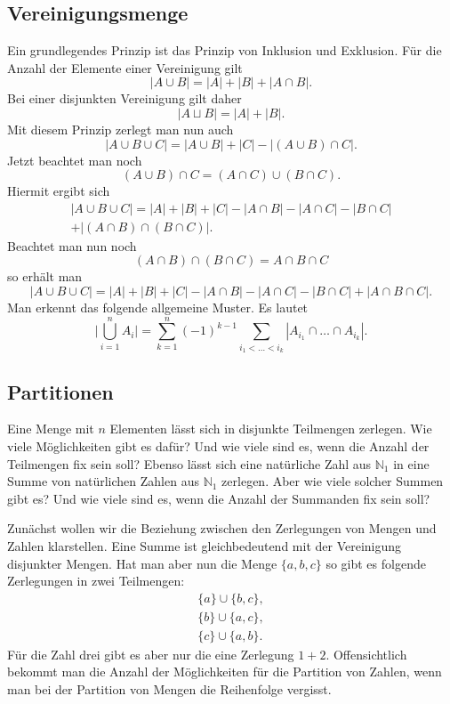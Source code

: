 \documentclass[a4paper,12pt,fleqn]{article}
\begin{document}
\subsection{Vereinigungsmenge}
Ein grundlegendes Prinzip ist das Prinzip von Inklusion und
Exklusion. Für die Anzahl der Elemente einer Vereinigung
gilt
\[|A\cup B| = |A|+|B|+|A\cap B|.\]
Bei einer disjunkten Vereinigung gilt daher
\[|A\sqcup B| = |A|+|B|.\]
Mit diesem Prinzip zerlegt man nun auch
\[|A\cup B\cup C| = |A\cup B|+|C|-|(A\cup B)\cap C|.\]
Jetzt beachtet man noch
\[(A\cup B)\cap C = (A\cap C)\cup(B\cap C).\]
Hiermit ergibt sich
\begin{gather*}
|A\cup B\cup C| = |A|+|B|+|C|-|A\cap B|-|A\cap C|-|B\cap C|\\
+|(A\cap B)\cap (B\cap C)|.
\end{gather*}
Beachtet man nun noch
\[(A\cap B)\cap (B\cap C) = A\cap B\cap C\]
so erhält man
\[|A\cup B\cup C|=|A|+|B|+|C|-|A\cap B|-|A\cap C|-|B\cap C|
+|A\cap B\cap C|.\]
Man erkennt das folgende allgemeine Muster. Es lautet
\[\bigg|\bigcup_{i=1}^n A_i\bigg|
= \sum_{k=1}^n (-1)^{k-1} \sum_{i_1<\ldots<i_k}
|A_{i_1}\cap\ldots\cap A_{i_k}|.\]

\subsection{Partitionen}

Eine Menge mit $n$ Elementen lässt sich in disjunkte Teilmengen
zerlegen. Wie viele Möglichkeiten gibt es dafür? Und wie viele sind
es, wenn die Anzahl der Teilmengen fix sein soll? Ebenso lässt sich
eine natürliche Zahl aus $\mathbb N_1$ in eine Summe von natürlichen
Zahlen aus $\mathbb N_1$ zerlegen. Aber wie viele solcher Summen gibt
es? Und wie viele sind es, wenn die Anzahl der Summanden fix sein
soll?

Zunächst wollen wir die Beziehung zwischen den Zerlegungen
von Mengen und Zahlen klarstellen. Eine Summe ist gleichbedeutend mit
der Vereinigung disjunkter Mengen. Hat man aber nun die Menge
$\{a,b,c\}$ so gibt es folgende Zerlegungen in zwei Teilmengen:
\begin{gather*}
\{a\}\cup\{b,c\},\\
\{b\}\cup\{a,c\},\\
\{c\}\cup\{a,b\}.
\end{gather*}
Für die Zahl drei gibt es aber nur die eine Zerlegung $1+2$.
Offensichtlich bekommt man die Anzahl der Möglichkeiten für
die Partition von Zahlen, wenn man bei der Partition von Mengen
die Reihenfolge vergisst.
\end{document}
